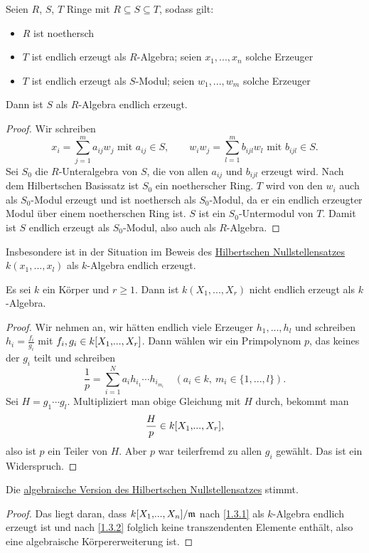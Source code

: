 \documentclass[a4paper,12pt,index=toc]{scrbook}
\theoremstyle{keinenummern} %
\def\m{\mathfrak{m}}
\renewcommand{\dotsc}{\ensuremath{\!...}}
\newcommand{\polyx}[1][n]{\ensuremath%
  [X_{1},\dotsc,X_{#1}]}
\begin{document}
\begin{lem}\label{1.3.1}
  Seien $R$, $S$, $T$ Ringe mit $R\subseteq S\subseteq T$, sodass gilt:
  \begin{itemize}
  \item $R$ ist noethersch
  \item $T$ ist endlich erzeugt als $R$-Algebra; seien $x_1,\dotsc,x_n$ solche Erzeuger
  \item $T$ ist endlich erzeugt als $S$-Modul; seien $w_1,\dotsc,w_m$ solche Erzeuger
  \end{itemize}
  Dann ist $S$ als $R$-Algebra endlich erzeugt.
\end{lem}
\begin{proof}
  Wir schreiben 
  \[ x_i=\displaystyle\sum_{j=1}^m a_{ij}w_j \text{ mit } a_{ij}\in S, \qquad
     w_iw_j=\displaystyle\sum_{l=1}^m b_{ijl}w_l \text { mit } b_{ijl}\in S. \]
  Sei $S_0$ die $R$-Unteralgebra von $S$, die von allen $a_{ij}$ und $b_{ijl}$ erzeugt wird. Nach dem Hilbertschen Basissatz ist
  $S_0$ ein noetherscher Ring. $T$ wird von den $w_i$ auch als $S_0$-Modul erzeugt und ist noethersch als $S_0$-Modul, da er ein
  endlich erzeugter Modul über einem noetherschen Ring ist. $S$ ist ein $S_0$-Untermodul von $T$. Damit ist $S$ endlich erzeugt
  als $S_0$-Modul, also auch als $R$-Algebra.
\end{proof}

Insbesondere ist in der Situation im Beweis des \hyperref[HNS]{Hilbertschen Nullstellensatzes} $k(x_1,\dotsc,x_l)$ als
$k$-Algebra endlich erzeugt.

\begin{lem}\label{1.3.2}
  Es sei $k$ ein Körper und $r\ge1$. Dann ist $k(X_1,\dotsc,X_r)$ nicht endlich erzeugt als $k$-Algebra.
\end{lem}
\begin{proof}
  Wir nehmen an, wir hätten endlich viele Erzeuger $h_1,\dotsc,h_l$ und schreiben $h_i=\frac{f_i}{g_i}$ mit $f_i,g_i\in
  k\polyx[r]$. Dann wählen wir ein Primpolynom $p$, das keines der $g_i$ teilt und schreiben
  \[ \frac1p = \sum_{i=1}^N a_i h_{i_1}\dotsm h_{i_{m_i}} \quad (a_i\in k,\ m_{i}\in\{1,\dotsc,l\}). \]
  Sei $H=g_1\dotsm g_l$. Multipliziert man obige Gleichung mit $H$ durch, bekommt man \[\frac{H}{p}\in k\polyx[r],\] also
  ist $p$ ein Teiler von $H$. Aber $p$ war teilerfremd zu allen $g_i$ gewählt. Das ist ein Widerspruch.
\end{proof}

\begin{prop}\label{1.3.3}
  Die \hyperref[s2a]{algebraische Version des Hilbertschen Nullstellensatzes} stimmt.
\end{prop}
\begin{proof}
  Das liegt daran, dass $\Quotient{k\polyx}{\m}$ nach \cref{1.3.1} als $k$-Algebra endlich erzeugt ist und nach \cref{1.3.2} folglich keine transzendenten Elemente enthält, also eine algebraische Körpererweiterung ist.
\end{proof}
\end{document}
